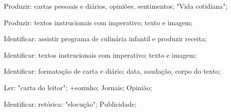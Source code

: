  Produzir: cartas pessoais e diários, opiniões, sentimentos; "Vida cotidiana";

 Produzir: textos instrucionais com imperativo; texto e imagem; 

 Identificar: assistir programa de culinária infantil e produzir receita;

 Identificar: textos instrucionais com imperativo; texto e imagem; 

 Identificar: formatação de carta e diário; data, saudação, corpo do texto;

 Ler: "carta do leitor"; +sozinho; Jornais; Opinião;

 Identificar: retórica: "elocução"; Publicidade;

